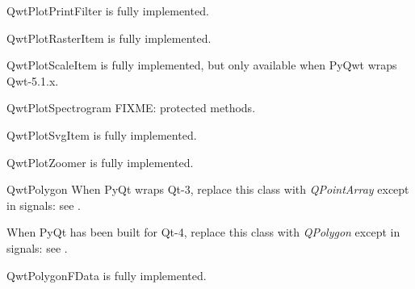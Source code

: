 \documentclass[a4paper,10pt,english]{manual}
\begin{document}
\hypertarget{PyQt4.Qwt5.QwtPlotPrintFilter}{}\begin{classdesc}{QwtPlotPrintFilter}{}
is fully implemented.
\end{classdesc}

\hypertarget{PyQt4.Qwt5.QwtPlotRasterItem}{}\begin{classdesc}{QwtPlotRasterItem}{}
is fully implemented.
\end{classdesc}

\hypertarget{PyQt4.Qwt5.QwtPlotScaleItem}{}\begin{classdesc}{QwtPlotScaleItem}{}
is fully implemented, but only available when PyQwt wraps Qwt-5.1.x.
\end{classdesc}

\hypertarget{PyQt4.Qwt5.QwtPlotSpectrogram}{}\begin{classdesc}{QwtPlotSpectrogram}{}
FIXME: protected methods.
\end{classdesc}

\hypertarget{PyQt4.Qwt5.QwtPlotSvgItem}{}\begin{classdesc}{QwtPlotSvgItem}{}
is fully implemented.
\end{classdesc}

\hypertarget{PyQt4.Qwt5.QwtPlotZoomer}{}\begin{classdesc}{QwtPlotZoomer}{}
is fully implemented.
\end{classdesc}

\hypertarget{PyQt4.Qwt5.QwtPolygon}{}\begin{classdesc}{QwtPolygon}{}
When PyQt wraps Qt-3, replace this class with
\emph{QPointArray} except in signals: see \hyperlink{PyQt4.Qwt5.QwtDoublePoint}{}.

When PyQt has been built for Qt-4, replace this class with \emph{QPolygon}
except in signals: see \hyperlink{PyQt4.Qwt5.QwtDoublePoint}{}.
\end{classdesc}

\hypertarget{PyQt4.Qwt5.QwtPolygonFData}{}\begin{classdesc}{QwtPolygonFData}{}
is fully implemented.
\end{classdesc}
\end{document}
